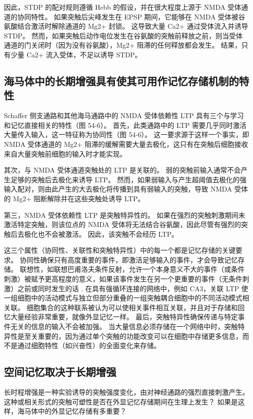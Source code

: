 因此，STDP 的配对规则遵循 Hebb 的假设，并在很大程度上源于 NMDA 受体通道的协同特性。 如果突触后尖峰发生在 EPSP 期间，它能够在 NMDA 受体被谷氨酸结合激活时解除通道的 Mg2+ 封锁。 这导致大量 Ca2+ 通过受体流入并诱导 STDP。 然而，如果突触后动作电位发生在谷氨酸的突触前释放之前，则当受体通道的门关闭时（因为没有谷氨酸），Mg2+ 阻滞的任何释放都会发生。 结果，只有少量 Ca2+ 流入受体，不足以诱导 STDP。

\subsection{海马体中的长期增强具有使其可用作记忆存储机制的特性}
Schaffer 侧支通路和其他海马通路中的 NMDA 受体依赖性 LTP 具有三个与学习和记忆直接相关的特性（图 54-6）。 首先，此类通路中的 LTP 需要几乎同时激活大量传入输入，这一特征称为协同性（图 54-6）。 这一要求源于这样一个事实，即 NMDA 受体通道的 Mg2+ 阻滞的缓解需要大量去极化，这只有在突触后细胞接收来自大量突触前细胞的输入时才能实现。

其次，与 NMDA 受体通道突触处的 LTP 是关联的。 弱的突触前输入通常不会产生足够的突触后去极化来诱导 LTP。 然而，如果弱输入与产生超阈值去极化的强输入配对，则由此产生的大去极化将传播到具有弱输入的突触，导致 NMDA 受体的 Mg2+ 阻断解除并在这些突触处诱导 LTP。

第三，NMDA 受体依赖性 LTP 是突触特异性的。 如果在强烈的突触刺激期间未激活特定突触，则该位点的 NMDA 受体将无法结合谷氨酸，因此尽管有强烈的突触后去极化也不会被激活。 因此，该突触不会经历 LTP。

这三个属性（协同性、关联性和突触特异性）中的每一个都是记忆存储的关键要求。 协同性确保只有高度重要的事件，即激活足够输入的事件，才会导致记忆存储。 联想性，如联想巴甫洛夫条件反射，允许一个本身意义不大的事件（或条件刺激）被赋予更高程度的意义，如果该事件发生在另一个更重要的事件（无条件刺激）之前或同时发生的话 . 在具有强循环连接的网络中，例如 CA3，关联 LTP 使一组细胞中的活动模式与独立但部分重叠的一组突触耦合细胞中的不同活动模式相关联。 细胞集合的这种联系被认为可以使相关事件相互关联，并且对于存储和回忆大量经验非常重要，就像外显记忆一样。 最后，突触特异性确保传递与特定事件无关的信息的输入不会被加强。 当大量信息必须存储在一个网络中时，突触特异性是至关重要的，因为通过单个突触的功能改变可以在细胞中存储更多信息，而不是通过细胞特性（如兴奋性）的全面变化来存储。

\subsection{空间记忆取决于长期增强}

长时程增强是一种实验诱导的突触强度变化，由对神经通路的强烈直接刺激产生。 这种或相关形式的突触可塑性是否在外显记忆存储期间在生理上发生？ 如果是这样，海马体中的外显记忆存储有多重要？

